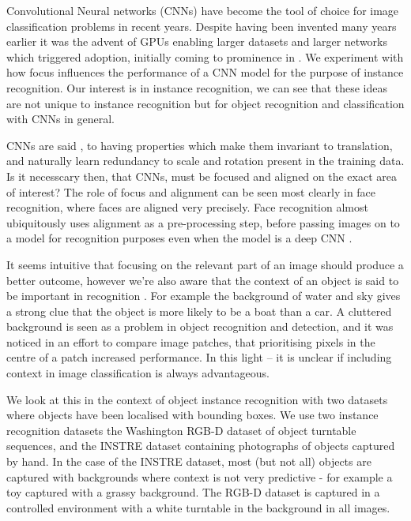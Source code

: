 Convolutional Neural networks (CNNs) \cite{LeCun1998} have become the tool of choice for image classification problems in recent years. Despite having been invented many years earlier it was the advent of GPUs enabling larger datasets and larger networks which triggered adoption, initially coming to prominence in \cite {Krizhevsky2012}.  We experiment with how focus influences the performance of a CNN model for the purpose of instance recognition. Our interest is in instance recognition, we can see that these ideas are not unique to instance recognition but for object recognition and classification with CNNs in general.

CNNs are said \cite{Krizhevsky2012}, to having properties which make them invariant to translation, and naturally learn redundancy to scale and rotation present in the training data. Is it necesscary then, that CNNs, must be focused and aligned on the exact area of interest? The role of focus and alignment can be seen most clearly in face recognition, where faces are aligned very precisely. Face recognition almost ubiquitously uses alignment as a pre-processing step, before passing images on to a model for recognition purposes even when the model is a deep CNN \cite{Taigman2014}.

It seems intuitive that focusing on the relevant part of an image should produce a better outcome, however we're also aware that the context of an object is said to be important in recognition \cite{Torralba2003}. For example the background of water and sky gives a strong clue that the object is more likely to be a boat than a car. A cluttered background is seen as a problem in object recognition and detection, and it was noticed in an effort to compare image patches, that prioritising pixels in the centre of a patch \cite{Zagoruyko2015} increased performance. In this light -- it is unclear if including context in image classification is always advantageous. 

We look at this in the context of object instance recognition with two datasets where objects have been localised with bounding boxes. We use two instance recognition datasets the Washington RGB-D dataset \cite{Lai2011} of object turntable sequences, and the INSTRE dataset \cite{Wang2015} containing photographs of objects captured by hand. In the case of the INSTRE dataset, most (but not all) objects are captured with backgrounds where context is not very predictive - for example a toy captured with a grassy background. The RGB-D dataset is captured in a controlled environment with a white turntable in the background in all images.

